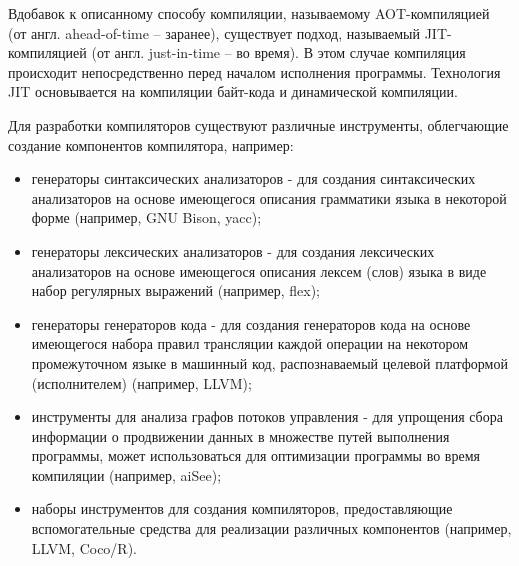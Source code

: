 Вдобавок к описанному способу компиляции, называемому AOT-компиляцией (от англ. ahead-of-time -- заранее), существует подход, называемый JIT-компиляцией (от англ. just-in-time -- во время).
В этом случае компиляция происходит непосредственно перед началом исполнения программы.
Технология JIT основывается на компиляции байт-кода и динамической компиляции.
\cite{prof_thain}

Для разработки компиляторов существуют различные инструменты, облегчающие создание компонентов компилятора, например:

\begin{itemize}
    \item генераторы синтаксических анализаторов - для создания синтаксических анализаторов на основе имеющегося описания грамматики языка в некоторой форме (например, GNU Bison, yacc);
    \item генераторы лексических анализаторов - для создания лексических анализаторов на основе имеющегося описания лексем (слов) языка в виде набор регулярных выражений (например, flex);
    \item генераторы генераторов кода - для создания генераторов кода на основе имеющегося набора правил трансляции каждой операции на некотором промежуточном языке в машинный код, распознаваемый целевой платформой (исполнителем) (например, LLVM);
    \item инструменты для анализа графов потоков управления - для упрощения сбора информации о продвижении данных в множестве путей выполнения программы, может использоваться для оптимизации программы во время компиляции (например, aiSee);
    \item наборы инструментов для создания компиляторов, предоставляющие вспомогательные средства для реализации различных компонентов (например, LLVM, Coco/R).
\end{itemize}
